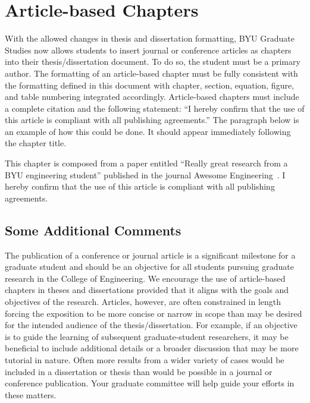 \chapter{Article-based Chapters}
\label{ch:article_based_chap}

With the allowed changes in thesis and dissertation formatting, BYU Graduate Studies
now allows students to insert journal or conference articles as chapters into their
thesis/dissertation document. To do so, the student must be a primary author. The
formatting of an article-based chapter must be fully consistent with the formatting
defined in this document with chapter, section, equation, figure, and table numbering
integrated accordingly. Article-based chapters must include a complete citation and
the following statement: ``I hereby confirm that the use of this article is compliant
with all publishing agreements.'' The paragraph below is an example of how this could
be done. It should appear immediately following the chapter title.

\noindent This chapter is composed from a paper entitled ``Really great research from
a BYU engineering student'' published in the journal Awesome Engineering~\autocite{StudentRP20}.
I hereby confirm that the use of this article is compliant with all publishing agreements.

\section{Some Additional Comments}
The publication of a conference or journal article is a significant milestone for a graduate 
student and should be an objective for all students pursuing graduate research in the College 
of Engineering. We encourage the use of article-based chapters in theses and dissertations 
provided that it aligns with the goals and objectives of the research. Articles, however, 
are often constrained in length forcing the exposition to be more concise or narrow in 
scope than may be desired for the intended audience of the thesis/dissertation. For example, 
if an objective is to guide the learning of subsequent graduate-student researchers, it 
may be beneficial to include additional details or a broader discussion that may be more 
tutorial in nature. Often more results from a wider variety of cases would be included 
in a dissertation or thesis than would be possible in a journal or conference publication. 
Your graduate committee will help guide your efforts in these matters.
